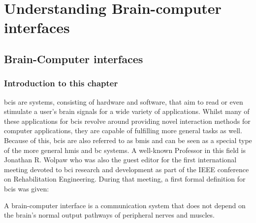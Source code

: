 

\part{Understanding Brain-computer interfaces}


\glsresetall

\chapter{Brain-Computer interfaces}
\label{ch:bci}

\section{Introduction to this chapter}
\label{sec:bci_introduction}

\Glspl{bci} are systems, consisting of hardware and software, that aim to read or even stimulate a user's brain signals for a wide variety of applications.
Whilst many of these applications for \glspl{bci} revolve around providing novel interaction methods for computer applications, they are capable of fulfilling more general tasks as well.
Because of this, \glspl{bci} are also referred to as \glspl{bmi} and can be seen as a special type of the more general \glspl{hmi} and \gls{bc} systems.
A well-known Professor in this field is Jonathan R. Wolpaw who was also the guest editor for the first international meeting devoted to \gls{bci} research and development as part of the IEEE conference on Rehabilitation Engineering.
During that meeting, a first formal definition for \glspl{bci} was given:

\setlength{\epigraphwidth}{0.9\textwidth}
\epigraph{A brain-computer interface is a communication system that does not depend on the brain’s normal output pathways of peripheral nerves and muscles.}{\textit{\citet{first_bci_meeting}}}

